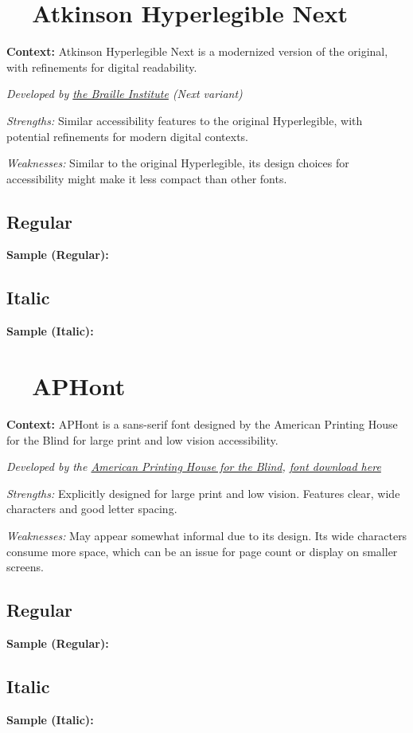 \pagebreak
\section{~~Atkinson Hyperlegible Next}\label{app5:troubleAtkinsonNext}
\noindent
\textbf{Context:} Atkinson Hyperlegible Next is a modernized version of the original, with refinements for digital readability.

\emph{Developed by \href{https://brailleinstitute.org/freefont}{the Braille Institute} (Next variant)}
\begin{raggedright}
	\emph{Strengths:} Similar accessibility features to the original Hyperlegible, with potential refinements for modern digital contexts.

	\emph{Weaknesses:} Similar to the original Hyperlegible, its design choices for accessibility might make it less compact than other fonts.

	\subsection{Regular}
	\noindent\textbf{Sample (Regular):}
	\FontSample{\atkinsonnextfont}

	\subsection{Italic}
	\noindent\textbf{Sample (Italic):}
	\FontSample{{\atkinsonnextfont\itshape}}
\end{raggedright}


\pagebreak
\section{~~APHont}\label{app5:trouble7}
\noindent
\textbf{Context:} APHont is a sans-serif font designed by the American Printing House for the Blind for large print and low vision accessibility.

\emph{Developed by the \href{https://www.aph.org/resources/large-print-guidelines/}{American Printing House for the Blind}, \href{https://www.aph.org/resources/large-print-guidelines/}{font download here}}
\begin{raggedright}
	\emph{Strengths:} Explicitly designed for large print and low vision. Features clear, wide characters and good letter spacing.

	\emph{Weaknesses:} May appear somewhat informal due to its design. Its wide characters consume more space, which can be an issue for page count or display on smaller screens.

	\subsection{Regular}
	\noindent\textbf{Sample (Regular):}
	\FontSample{\aphontfont}

	\subsection{Italic}
	\noindent\textbf{Sample (Italic):}
	\FontSample{{\aphontfont\itshape}}
\end{raggedright}


